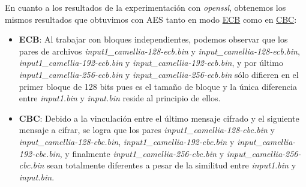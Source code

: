 \documentclass[a4paper, 11pt]{article}
\begin{document}
		En cuanto a los resultados de la experimentación con \textit{openssl}, obtenemos los mismos resultados que obtuvimos
		con AES tanto en modo \hyperref[AES-ECB]{ECB} como en \hyperref[AES-CBC]{CBC}:
		\begin{itemize}
			\item \textbf{ECB}: Al trabajar con bloques independientes, podemos observar que los pares de archivos
			\textit{input1\_camellia-128-ecb.bin} y \textit{input\_camellia-128-ecb.bin}, \textit{input1\_camellia-192-ecb.bin}
			y \textit{input\_camellia-192-ecb.bin}, y por último \textit{input1\_camellia-256-ecb.bin} y
			\textit{input\_camellia-256-ecb.bin} sólo difieren en el primer bloque de 128 bits pues es el tamaño de bloque y
			la única diferencia entre \textit{input1.bin} y \textit{input.bin} reside al principio de ellos.
			
			\item \textbf{CBC}: Debido a la vinculación entre el último mensaje cifrado y el siguiente mensaje a cifrar, se
			logra que los pares \textit{input1\_camellia-128-cbc.bin} y \textit{input\_camellia-128-cbc.bin},
			\textit{input1\_camellia-192-cbc.bin} y \textit{input\_camellia-192-cbc.bin}, y finalmente \textit{input1\_camellia-256-cbc.bin}
			y \textit{input\_camellia-256-cbc.bin} sean totalmente diferentes a pesar de la similitud entre \textit{input1.bin}
			y \textit{input.bin}.
		\end{itemize}
\end{document}
